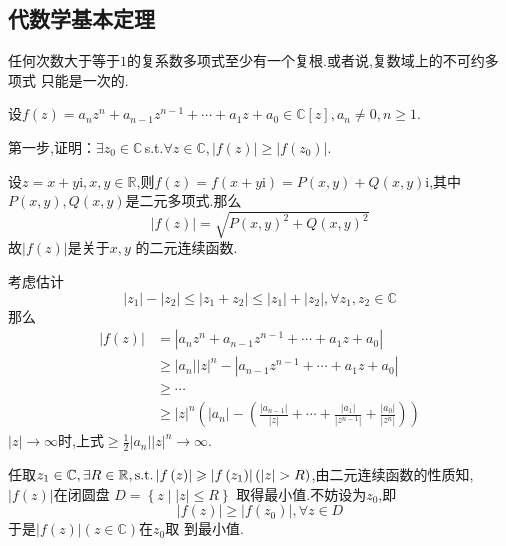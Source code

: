 \subsection{代数学基本定理}
\begin{formal}
\begin{theorem}[代数学基本定理]\label{thm:代数学基本定理}
    任何次数大于等于$1$的复系数多项式至少有一个复根.或者说,复数域上的不可约多项式
    只能是一次的.
\end{theorem}
\begin{Proof}
设$f\left(z\right)=a_nz^n+a_{n-1}z^{n-1}+\cdots+a_1z+a_0\in\mathbb{C}\left[z\right],a_n\neq 0,n\geqslant 1.
$

第一步,证明：$\exists z_0\in\mathbb{C}$\,\textup{s.t.}$\forall z\in\mathbb{C},
\left|f\left(z\right)\right|\geqslant \left|f\left(z_0\right)\right|$.

设$z=x+y\mathrm{i},x,y\in\mathbb{R}$,则$f\left(z\right)=f\left(x+y\mathrm{i}\right)=
P\left(x,y\right)+Q\left(x,y\right)\mathrm{i}$,其中$P\left(x,y\right),Q\left(x,y\right)
$是二元多项式.那么\[
\left|f\left(z\right)\right|
=\sqrt{P\left(x,y\right)^2+
Q\left(x,y\right)^2}
\]
故$\left|f\left(z\right)\right|$是关于$x,y$
的二元连续函数.

考虑估计
\[
\left|z_1\right|-\left|z_2\right|\leqslant \left|z_1+z_2\right|\leqslant \left|z_1\right|+\left|z_2\right|,\forall z_1,z_2\in\mathbb{C}
\]
那么
\begin{align*}
    \left|f\left(z\right)\right|&=\left|a_nz^n+a_{n-1}z^{n-1}+\cdots+a_1z+a_0\right|\\
&\geqslant \left|a_n\right|\left|z\right|^n-\left|a_{n-1}z^{n-1}+\cdots+a_1z+a_0\right|\\
&\geqslant\cdots\\
&\geqslant \left|z\right|^n\left(
    \left|a_n\right|-
    \left(
        \frac{\left|a_{n-1}\right|}{\left|z\right|}+
        \cdots+
        \frac{\left|a_1\right|}{\left|z^{n-1}\right|}+
        \frac{\left|a_0\right|}{\left|z^n\right|}
    \right)
\right)
\end{align*}
$\left|z\right|\to \infty$时,上式$\displaystyle
\geqslant \frac{1}{2}\left|a_n\right|\left|z\right|^n\to
 \infty.$

 任取$z_1\in\mathbb{C},\exists R\in\mathbb{R},\textup{s.t.}\left|f\left(z\right)\right|\geqslant \left|f\left(z_1\right)\right|\left(
    \left|z\right|>R\right)$,由二元连续函数的性质知,
    $\left|f\left(z\right)\right|$在闭圆盘
    $D=\left\{z\mid \left|z\right|\leqslant R\right\}$
    取得最小值.不妨设为$z_0$,即
    \[
    \left|f\left(z\right)\right|\geqslant \left|f\left(z_0\right)\right|,\forall z\in 
    D
    \]
    于是$\left|f\left(z\right)\right|\left(z\in\mathbb{C}
    \right)$在$z_0$取
    到最小值.


\end{Proof}
\end{formal}
